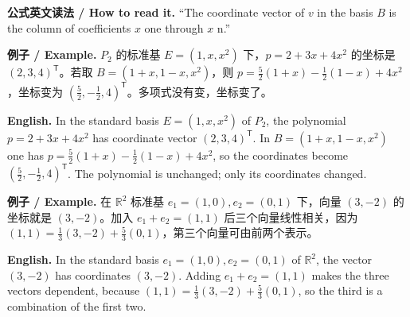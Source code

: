 \documentclass[UTF8,11pt,a4paper]{ctexart}
\newcommand{\EN}[1]{\par\noindent\textbf{English.} #1\par}
\newcommand{\READ}[1]{\par\noindent\textbf{公式英文读法 / How to read it.} #1\par}
\newcommand{\EX}[2]{\par\noindent\textbf{例子 / Example.} #1\par\EN{#2}}
\begin{document}
\READ{``The coordinate vector of $v$ in the basis $B$ is the column of coefficients $x$ one through $x$ n.''}
\EX{$P_2$ 的标准基 $E=(1,x,x^2)$ 下，$p=2+3x+4x^2$ 的坐标是 $(2,3,4)^{\mathsf T}$。若取 $B=(1+x,1-x,x^2)$，则 $p=\frac52(1+x)-\frac12(1-x)+4x^2$，坐标变为 $(\frac52,-\frac12,4)^{\mathsf T}$。多项式没有变，坐标变了。}{In the standard basis $E=(1,x,x^2)$ of $P_2$, the polynomial $p=2+3x+4x^2$ has coordinate vector $(2,3,4)^{\mathsf T}$. In $B=(1+x,1-x,x^2)$ one has $p=\frac52(1+x)-\frac12(1-x)+4x^2$, so the coordinates become $(\frac52,-\frac12,4)^{\mathsf T}$. The polynomial is unchanged; only its coordinates changed.}
\EX{在 $\mathbb R^2$ 标准基 $e_1=(1,0),e_2=(0,1)$ 下，向量 $(3,-2)$ 的坐标就是 $(3,-2)$。加入 $e_1+e_2=(1,1)$ 后三个向量线性相关，因为 $(1,1)=\frac13(3,-2)+\frac53(0,1)$，第三个向量可由前两个表示。}{In the standard basis $e_1=(1,0),e_2=(0,1)$ of $\mathbb R^2$, the vector $(3,-2)$ has coordinates $(3,-2)$. Adding $e_1+e_2=(1,1)$ makes the three vectors dependent, because $(1,1)=\frac13(3,-2)+\frac53(0,1)$, so the third is a combination of the first two.}
\end{document}
